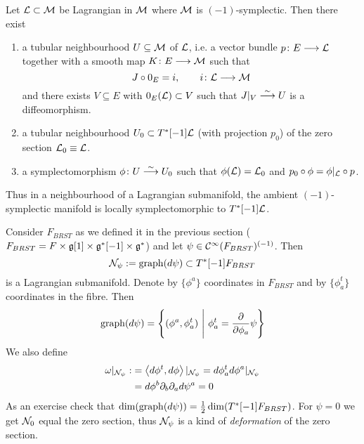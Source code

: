 \begin{theo}
  Let $\mathcal{L} \subset \mathcal{M}$ be Lagrangian in $\mathcal{M}$ where $\mathcal{M}$ is $(-1)$-symplectic. Then there exist
  \begin{enumerate}
    \item a tubular neighbourhood $U \subseteq \mathcal{M}$ of $\mathcal{L}$, i.e. a vector bundle $p \colon E \longrightarrow \mathcal{L}$ together with a smooth map $K \colon E \longrightarrow \mathcal{M}$ such that
    \begin{equation}
      J \circ 0_E = i, \quad \quad i \colon \mathcal{L} \longrightarrow \mathcal{M}
    \end{equation}
    and there exists $V \subseteq E$ with $0_E(\mathcal{L}) \subset V$ such that $J|_V \overset{\sim}{\longrightarrow} U$ is a diffeomorphism.

    \item a tubular neighbourhood $U_0 \subset T^*[-1] \mathcal{L}$ (with projection $p_0$) of the zero section $\mathcal{L}_0 \equiv \mathcal{L}$.

    \item a symplectomorphism $\phi \colon U \atob{\sim} U_0$ such that $\phi(\LL) = \LL_0$ and $p_0 \circ \phi = \phi|_\LL \circ p$.
  \end{enumerate}
\end{theo}

Thus in a neighbourhood of a Lagrangian submanifold, the ambient $(-1)$-symplectic manifold is locally symplectomorphic to $T^*[-1]\mathcal{L}$.

\begin{example}
  Consider $F_{BRST}$ as we defined it in the previous section ($F_{BRST} = F \times \mathfrak{g}[1] \times \mathfrak{g}^*[-1] \times \mathfrak{g}^*$) and let $\psi \in \mathcal{C}^{\infty}(F_{BRST})^{(-1)}$. Then
  \begin{equation}
    \mathcal{N}_\psi := \operatorname{graph}(d \psi) \subset T^*[-1]F_{BRST}
  \end{equation}
  is a Lagrangian submanifold. Denote by $\{\phi^a\}$ coordinates in $F_{BRST}$ and by $\{\phi^t_a\}$ coordinates in the fibre. Then
  \begin{equation}
    \graph(d \psi) = \left\{ (\phi^a, \phi^t_a) \ \Bigg| \ \phi^t_a = \dell{}{\phi_a} \psi \right\}
  \end{equation}
  We also define
  \begin{align}
    \omega |_{\NC_\psi} :&= \pair{d\phi^t}{d\phi} |_{\NC_\psi} = d \phi^t_a d\phi^a |_{\NC_\psi} \\
    &= d\phi^b \partial_b \partial_a d\psi^a = 0
  \end{align}
  As an exercise check that $\dim(\operatorname{graph}(d \psi)) = \frac{1}{2} \dim(T^*[-1]F_{BRST})$. For $\psi = 0$ we get $\mathcal{N}_0$ equal the zero section, thus $\mathcal{N}_\psi$ is a kind of \emph{deformation} of the zero section.
\end{example}

